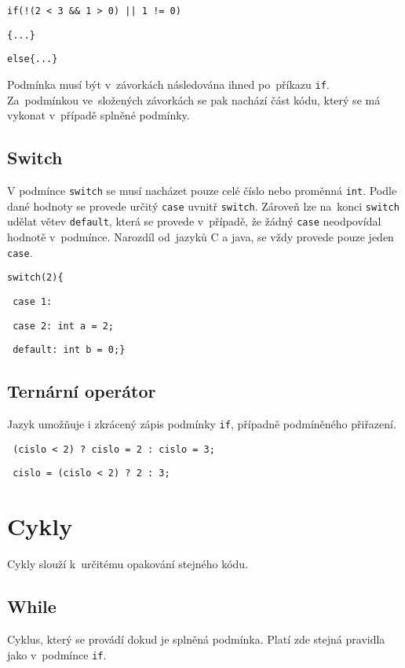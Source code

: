 \documentclass[czech]{thesiskiv}
\begin{document}

\texttt{if(!(2 < 3 \&\& 1 > 0) || 1 != 0)} 

\texttt{\{...\}}

\texttt{else\{...\} }

\noindent Podmínka musí být v~závorkách následována ihned po~příkazu \texttt{if}.
Za~podmínkou ve~složených závorkách se pak nachází část kódu, který se má vykonat v~případě splněné podmínky.

\subsection{Switch}
V podmínce \texttt{switch} se musí nacházet pouze celé číslo nebo proměnná  \texttt{int}.
Podle dané hodnoty se provede určitý \texttt{case} uvnitř \texttt{switch}.
Zároveň lze na~konci \texttt{switch} udělat větev \texttt{default}, která 
se provede v~případě, že žádný \texttt{case} neodpovídal hodnotě v~podmínce.
Narozdíl od~jazyků C a java, se vždy provede pouze jeden \texttt{case}.


\texttt{switch(2)\{}

\texttt{    case 1: }

\texttt{    case 2: int a = 2;}

\texttt{    default: int b = 0;\}}

\subsection{Ternární operátor}
Jazyk umožňuje i zkrácený zápis podmínky \texttt{if}, případně podmíněného přiřazení.


\texttt{  (cislo < 2) ? cislo = 2 : cislo = 3;}


\texttt{  cislo = (cislo < 2) ? 2 : 3;}

               
\section{Cykly}
Cykly slouží k~určitému opakování stejného kódu.

\subsection{While}
Cyklus, který se provádí dokud je splněná podmínka.
Platí zde stejná pravidla jako v~podmínce \texttt{if}.
\end{document}
